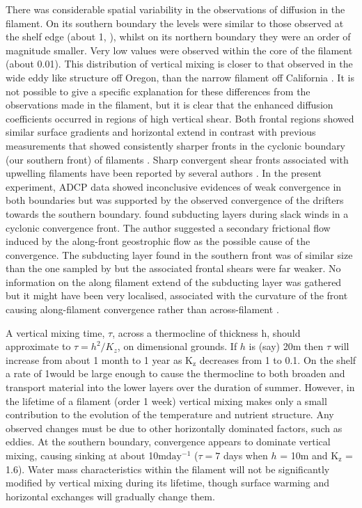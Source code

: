 There was considerable spatial variability in the observations of
diffusion in the filament.  On its southern boundary the levels
were similar to those observed at the shelf edge (about 1\mixc,
\citet{Barton01}), whilst on its northern boundary they were an
order of magnitude smaller. Very low values were observed within
the core of the filament (about 0.01\mixc ).  This distribution of
vertical mixing is closer to that observed in the wide eddy like
structure off Oregon, \citep{Moum88} than the narrow filament off
California \citep{Dewey93}.  It is not possible to give a specific
explanation for these differences from the observations made in
the filament, but it is clear that the enhanced diffusion
coefficients occurred in regions of high vertical shear. Both
frontal regions showed similar surface gradients and horizontal
extend in contrast with previous measurements that showed
consistently sharper fronts in the cyclonic boundary (our southern
front) of filaments \citep{Washburn91,Dewey91,Flament00}.  Sharp
convergent shear fronts associated with upwelling filaments have
been reported by several authors \citep[e.g.][]{Moum90,Flament00}.
In the present experiment, ADCP data showed inconclusive evidences
of weak convergence in both boundaries but was supported by the
observed convergence of the drifters towards the southern
boundary. \citet{Flament00} found subducting layers during slack
winds in a cyclonic convergence front. The author suggested a
secondary frictional flow induced by the along-front geostrophic
flow as the possible cause of the convergence. The subducting
layer found in the southern front was of similar size than the one
sampled by \citet{Flament00} but the associated frontal shears
were far weaker. No information on the along filament extend of
the subducting layer was gathered but it might have been very
localised, associated with the curvature of the front causing
along-filament convergence rather than across-filament
\citep{Shearman99}.

A vertical mixing time, $\tau$, across a thermocline of thickness
h, should approximate to $\tau = {h^2}/{K_z}$, on dimensional
grounds. If $h$ is (say) 20m then $\tau$ will increase from about
1 month to 1 year as $\mathrm{K_z}$ decreases from 1 to 0.1\mixc.
On the shelf a rate of 1\mixc would be large enough to cause the
thermocline to both broaden and transport material into the lower
layers over the duration of summer. However, in the lifetime of a
filament (order 1 week) vertical mixing makes only a small
contribution to the evolution of the temperature and nutrient
structure.  Any observed changes must be due to other horizontally
dominated factors, such as eddies.  At the southern boundary,
convergence appears to dominate vertical mixing, causing sinking
at about 10$\mathrm{m day^{-1}}$ ($\tau=7$ days when $h$ = 10m and
$\mathrm{K_z}$ = 1.6\mixc ).  Water mass characteristics within
the filament will not be significantly modified by vertical mixing
during its lifetime, though surface warming and horizontal
exchanges will gradually change them.

